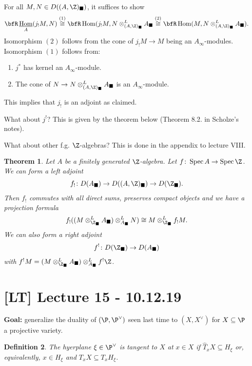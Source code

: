 \documentclass[A4paper, british]{amsart}
\theoremstyle{darkgreentheorem}
\newtheorem{thm}{Theorem}[section]
\theoremstyle{darkbluedefinition}
\newtheorem{defn}[thm]{Definition}
\theoremstyle{darkredexample}
\theoremstyle{remark}
\DeclareMathOperator{\Hom}{Hom}
\DeclareMathOperator{\Spec}{Spec}
\DeclareMathOperator{\ihom}{\underline{Hom}}
\newcommand{\1}{\mathbbm{1}}
\newcommand{\ot}{\otimes}
\newcommand{\dual}{^{\vee}}
\newcommand{\sub}{\subseteq}
\newcommand{\usolid}{_{\blacksquare}}
\begin{document}
For all $M,N\in D((A,\Z)\usolid)$, it suffices to show
\[ \bfR\ihom_{A}(j_{!}M,N)\overset{(1)}{\cong} \bfR\Hom(j_{!}M,N\ot_{(A,\Z)\usolid}^{L}A\usolid\overset{(2)}{\cong} \bfR\Hom(M,N\ot_{(A,\Z)\usolid}^{L}A\usolid ). \]
Isomorphism $(2)$ follows from the cone of $j_{!}M\to M$ being an $A_{\infty}$-modules.
Isomorphism $(1)$ follows from:
\begin{enumerate}
    \item $j^{*}$ has kernel an $A_{\infty}$-module.
    \item The cone of $N\to N\ot_{(A,\Z)\usolid}^{L}A\usolid$ is an $A_{\infty}$-module.
\end{enumerate}
This implies that $j_{!}$ is an adjoint as claimed.

What about $j^{!}$? This is given by the theorem below (Theorem 8.2. in Scholze's notes).

What about other f.g. $\Z$-algebras?
This is done in the appendix to lecture VIII.

\begin{thm}
    Let $A$ be a finitely generated $\Z$-algebra.
    Let $f\colon \Spec{A}\to \Spec{\Z}$.
    We can form a left adjoint
    \[ f_{!}\colon D(A\usolid)\to D((A,\Z)\usolid)\to D(\Z\usolid). \]
    Then $f_{!}$ commutes with all direct sums, preserves compact objects and we have a projection formula
    \[ f_{!}((M\ot^{L}_{\Z\usolid}A\usolid)\ot^{L}_{A\usolid} N)\cong M\ot_{\Z\usolid}^{L}f_{!}M. \]
    We can also form a right adjoint
    \[ f^{!}\colon D(\Z\usolid)\to D(A\usolid) \]
    with $f^{!}M=(M\ot_{\Z\usolid}^{L}A\usolid )\ot_{A\usolid}^{L}f^{!}\Z$.
\end{thm}

\section{[LT] Lecture 15 - 10.12.19}

\textbf{Goal:} generalize the duality of $(\P,\P\dual)$ seen last time to $(X,X\dual)$ for $X\sub \P$ a projective variety.

\begin{defn}
    The hyerplane $\xi\in \P\dual$ is \textit{tangent to $X$ at $x\in X$} if $\hat{T}_{x}X\sub H_{\xi}$ or, equivalently, $x\in H_{\xi}$ and $T_{x}X\sub T_{x}H_{\xi}$.
\end{defn}
\end{document}
